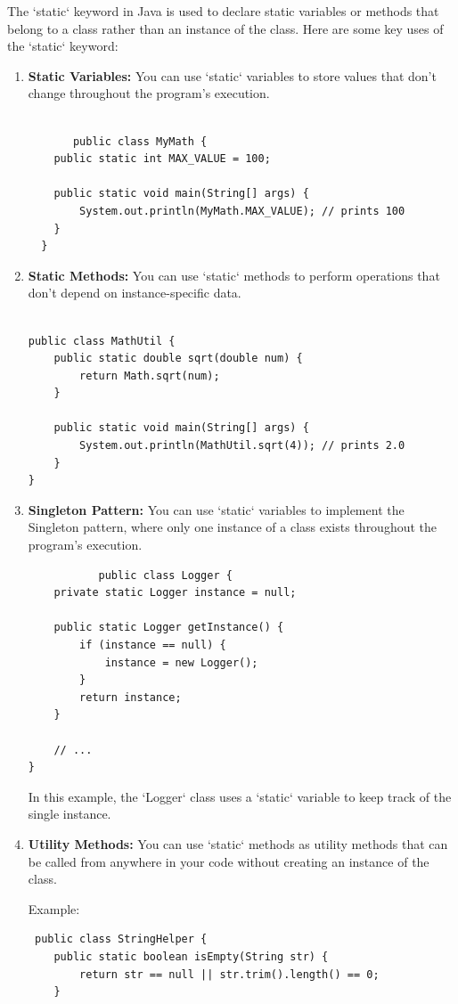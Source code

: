\documentclass{book}
\begin{document}
The `static` keyword in Java is used to declare static variables or methods that belong to a class rather than an instance of the class. Here are
some key uses of the `static` keyword:
\begin{enumerate}
	\item  \textbf{Static Variables:} You can use `static` variables to store values that don't change throughout the program's execution.
	      \begin{verbatim}

       public class MyMath {
    public static int MAX_VALUE = 100;

    public static void main(String[] args) {
        System.out.println(MyMath.MAX_VALUE); // prints 100
    }
  }
    \end{verbatim}
	\item  \textbf{Static Methods:} You can use `static` methods to perform operations that don't depend on instance-specific data.
	      \begin{verbatim}
       
public class MathUtil {
    public static double sqrt(double num) {
        return Math.sqrt(num);
    }

    public static void main(String[] args) {
        System.out.println(MathUtil.sqrt(4)); // prints 2.0
    }
}
    \end{verbatim}
	\item\textbf{Singleton Pattern: }You can use `static` variables to implement the Singleton pattern, where only one instance of a class exists throughout
	      the program's execution.
	      \begin{verbatim}
           public class Logger {
    private static Logger instance = null;

    public static Logger getInstance() {
        if (instance == null) {
            instance = new Logger();
        }
        return instance;
    }

    // ...
}
        \end{verbatim}
	      In this example, the `Logger` class uses a `static` variable to keep track of the single instance.
	\item \textbf{Utility Methods: } You can use `static` methods as utility methods that can be called from anywhere in your code without creating an instance
	      of the class.

	      Example:
	      \begin{verbatim}
 public class StringHelper {
    public static boolean isEmpty(String str) {
        return str == null || str.trim().length() == 0;
    }


\end{verbatim}
\end{enumerate}
\end{document}
